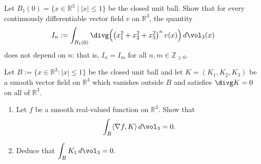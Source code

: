 \begin{exercise}
\label{ex:radial_weight_flux_independent}
Let $B_1(0) = \{x \in \mathbb{R}^3 \mid \lvert x\rvert \le 1\}$ be the closed unit ball. Show that
for every continuously differentiable vector field $v$ on $\mathbb{R}^3$, the quantity
\[I_n := \int_{B_1(0)} \divg\Big(\big(x_1^2+x_2^2+x_3^2\big)^n\, v(x)\Big) \, d\vol_3(x)\]
does not depend on $n$: that is, $I_n = I_m$ for all $n,m \in \mathbb{Z}_{\ge 0}$.
\end{exercise}

\begin{exercise}
\label{ex:knoerrer_divergence_free_compact_support}
Let $B := \{x \in \mathbb{R}^3 : \lvert x\rvert \le 1\}$ be the closed unit ball and let
$K = (K_1,K_2,K_3)$ be a smooth vector field on $\mathbb{R}^3$ which vanishes outside $B$ and
satisfies $\divg K = 0$ on all of $\mathbb{R}^3$.
\begin{enumerate}[label=\textbf{(\alph*)}]
  \item Let $f$ be a smooth real-valued function on $\mathbb{R}^3$. Show that
    \[\int_B \langle \nabla f, K\rangle \, d\vol_3 = 0.\]
  \item Deduce that $\displaystyle\int_B K_1 \, d\vol_3 = 0$.
\end{enumerate}
\end{exercise}

